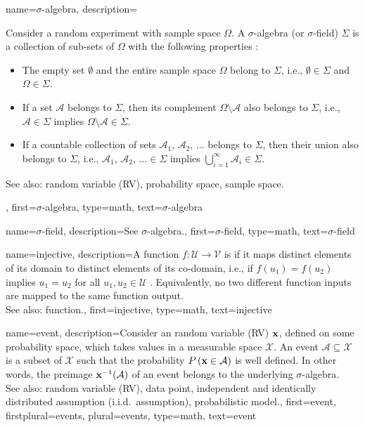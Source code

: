 {
{name={$\sigma$-algebra}, 
	description={Consider a random experiment with sample space $\Omega$. 
		A $\sigma$-algebra (or $\sigma$-field) $\Sigma$ 
		is a collection of sub-sets of $\Omega$ with the following properties 
		\cite{RudinBook,BillingsleyProbMeasure,durrett2010probability}:
		 \begin{itemize}
		 	\item The empty set $\emptyset$ and the entire sample space 
		 	$\Omega$ belong to $\Sigma$, i.e., $\emptyset \in \Sigma$ and $\Omega \in \Sigma$.
		 	\item If a set $\mathcal{A}$ belongs to $\Sigma$, then its complement 
		 	$\Omega \setminus \mathcal{A}$ also belongs to $\Sigma$, i.e., 
		 	$\mathcal{A} \in \Sigma$ implies $\Omega \setminus \mathcal{A} \in \Sigma$.
		 	\item If a countable collection of sets $\mathcal{A}_1, \,\mathcal{A}_2, \,\ldots$ belongs 
			to $\Sigma$, 
		 	then their union also belongs to $\Sigma$, i.e.,
		 	$\mathcal{A}_1, \,\mathcal{A}_2, \,\ldots \in \Sigma$ implies 
		 	$\bigcup_{i=1}^{\infty} \mathcal{A}_i \in \Sigma$.	
		 \end{itemize}			 
		See also: random variable (RV), probability space, sample space.},
	first={$\sigma$-algebra},
	type=math, 
	text={$\sigma$-algebra} 
}

{name={$\sigma$-field}, 
	description={See $\sigma$-algebra.}, 
	first={$\sigma$-field},
	type=math,
	text={$\sigma$-field} 
}


{name={injective}, 
	description={A function $f: \mathcal{U} \rightarrow \mathcal{V}$ is 
	if it maps distinct elements of its domain to distinct elements 
	of its co-domain, 
    i.e., if $f(u_1) = f(u_2)$ implies $u_1 = u_2$ for all $u_1, u_2 \in \mathcal{U}$ 
        \cite{HalmosSet}. 
    Equivalently, no two different function inputs are mapped to the same function output.
				\\
		See also: function.},
	first={injective},
	type=math,
	text={injective} 
}


{name={event}, 
	description={Consider an random variable (RV) ${\bf x}$, defined on some probability space, 
		which takes values in a measurable space $\mathcal{X}$. An 
		event $\mathcal{A} \subseteq \mathcal{X}$ is a subset of $\mathcal{X}$ 
		such that the probability $P\left({\bf x} \in \mathcal{A}\right)$ is well 
		defined. In other words, the preimage ${\bf x}^{-1}(\mathcal{A})$ 
		of an event belongs to the underlying $\sigma$-algebra. 
				\\
		See also: random variable (RV), data point, independent and identically distributed assumption (i.i.d.\ assumption), probabilistic model.},
	first={event},
	firstplural={events},
	plural={events},
	type=math,
	text={event} 
}

}
